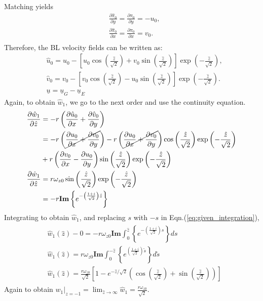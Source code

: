 \documentclass{article}
\newcommand{\pd}[2]{\frac{\partial{#1}}{\partial{#2}}}
\begin{document}
Matching yields 
\begin{align}
 & \pd{\hat{\pi}_{0}}{y} = \pd{\pi_{0}}{y} = -u_{0},\\
 & \pd{\hat{\pi}_{0}}{x} = \pd{\pi_{0}}{x} = v_{0}.\\
\end{align}
%
Therefore, the BL velocity fields can be written as:
%
\begin{align}
 & \hat{u}_{0} = u_{0} - \left[u_{0}\cos{\left(\frac{\hat{z}}{\sqrt{2}} \right)} + v_{0}\sin{\left(\frac{\hat{z}}{\sqrt{2}} \right)}\right] \exp{\left(-\frac{\hat{z}}{\sqrt{2}} \right)} ,\\
 & \hat{v}_{0} = v_{0} - \left[v_{0}\cos{\left(\frac{\hat{z}}{\sqrt{2}} \right)} - u_{0}\sin{\left(\frac{\hat{z}}{\sqrt{2}} \right)} \right] \exp{\left(-\frac{\hat{z}}{\sqrt{2}} \right)} .\\
 & \underline{u} = \underline{u}_{G} -  \underline{u}_{E}
\end{align}
Again, to obtain $\hat{w}_{1}$, we go to the next order and use the continuity equation. 
\begin{align}
 \begin{split}
  \pd{\hat{w}_{1}}{\hat{z}} &= -r\left(\pd{\hat{u}_{0}}{x} + \pd{\hat{v}_{0}}{y} \right)\\
  &=-r\left(\cancel{\pd{u_{0}}{x} + \pd{v_{0}}{y} }\right) -r\left(\cancel{\pd{u_{0}}{x} + \pd{v_{0}}{y} }\right)\cos{\left(\frac{\hat{z}}{\sqrt{2}}\right)}\exp{\left(-\frac{\hat{z}}{\sqrt{2}} \right)}\\
  &+r\left(\pd{v_{0}}{x} - \pd{u_{0}}{y} \right)\sin{\left(\frac{\hat{z}}{\sqrt{2}}\right)}\exp{\left(-\frac{\hat{z}}{\sqrt{2}} \right)}\\
  \pd{\hat{w}_{1}}{\hat{z}}  &= r\omega_{z0}\sin{\left(\frac{\hat{z}}{\sqrt{2}}\right)}\exp{\left(-\frac{\hat{z}}{\sqrt{2}} \right)}\\
  & = -r\mathbf{Im}\left\{e^{-\left(\frac{1+i}{\sqrt{2}}\right)\hat{z}} \right\}
 \end{split}
\end{align}
Integrating to obtain $\hat{w}_{1}$, and replacing $s$ with $-s$ in Eqn.(\ref{eq:given_integration}),
\begin{align}
 \begin{split}
 & \hat{w}_{1}(\hat{z}) - 0= -r\omega_{z0}\mathbf{Im} \int_{0}^{\hat{z}}\left\{e^{-\left(\frac{1+i}{\sqrt{2}}\right)s}  \right\}ds\\
 & \hat{w}_{1}(\hat{z}) = r\omega_{z0}\mathbf{Im} \int_{0}^{-\hat{z}}\left\{e^{\left(\frac{1+i}{\sqrt{2}}\right)\tilde{s}}  \right\}d\tilde{s}\\
 & \hat{w}_{1}(\hat{z}) = \frac{r\omega_{z0}}{\sqrt{2}}\left[ 1 - e^{-\hat{z}/\sqrt{2}}\left(\cos{\left(\frac{\hat{z}}{\sqrt{2}} \right)} + \sin{\left(\frac{\hat{z}}{\sqrt{2}}\right)} \right) \right]
 \end{split}
\end{align}
Again to obtain $\boxed{w_{1}\big|_{z=-1} = \lim_{\hat{z}\rightarrow \infty}\hat{w}_{1} = \frac{r\omega_{z0}}{\sqrt{2}} }$.
\end{document}
